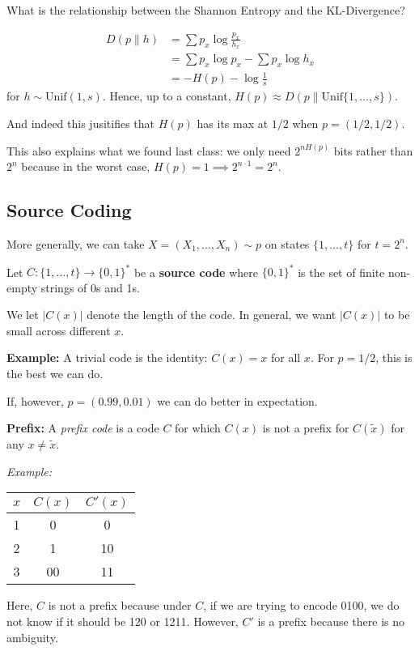 \documentclass[12pt]{article}
\newcommand{\abs}[1]{\left\vert #1 \right\vert}
\newcommand*{\tbf}[1]{\ifmmode\mathbf{#1}\else\textbf{#1}\fi}
\begin{document}
What is the relationship between the Shannon Entropy and the KL-Divergence?

\begin{align*}
    D(p \parallel h) & = \sum p_x \log \frac{p_x}{h_x}         \\
                     & = \sum p_x \log p_x - \sum p_x \log h_x \\
                     & = -H(p) - \log \frac{1}{s}
\end{align*}
for $h \sim \text{Unif}(1, s)$. Hence, up to a constant, $H(p) \approx D(p \parallel \text{Unif}\{1, \dots, s\})$.

And indeed this jusitifies that $H(p)$ has its max at $1/2$ when $p = (1/2, 1/2)$.

This also explains what we found last class: we only need $2^{nH(p)}$ bits rather than $2^n$ because in the worst case, $H(p) = 1 \implies 2^{n\cdot 1} = 2^n$.

\subsection{Source Coding}
More generally, we can take $X = (X_1, \dots, X_n) \sim p$ on states $\{1, \dots, t\}$ for $t = 2^n$.

Let $C: \{1, \dots, t\} \to \{0, 1\}^*$ be a \tbf{source code} where $\{0, 1\}^*$ is the set of finite non-empty strings of 0s and 1s.

We let $\abs{C(x)}$ denote the length of the code. In general, we want $\abs{C(x)}$ to be small across different $x$.

\tbf{Example:} A trivial code is the identity: $C(x) = x$ for all $x$. For $p = 1/2$, this is the best we can do.

If, however, $p = (0.99, 0.01)$ we can do better in expectation.

\tbf{Prefix:} A \emph{prefix code} is a code $C$ for which $C(x)$ is not a prefix for $C(\tilde x)$ for any $x \neq \tilde x$.

\emph{Example:}

\qquad \begin{tabular}{c|cc}
    $x$ & $C(x)$ & $C'(x)$ \\ \hline
    1   & 0      & 0       \\
    2   & 1      & 10      \\
    3   & 00     & 11      \\ \hline
\end{tabular}

Here, $C$ is not a prefix because under $C$, if we are trying to encode 0100, we do not know if it should be 120 or 1211. However, $C'$ is a prefix because there is no ambiguity.
\end{document}
